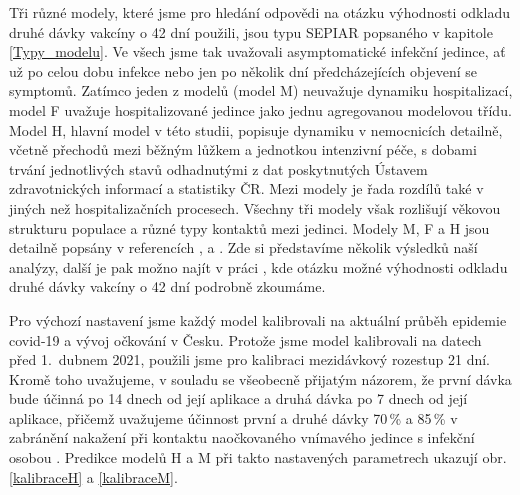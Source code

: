Tři různé modely, které jsme pro hledání odpovědi na otázku výhodnosti odkladu druhé dávky vakcíny o 42 dní použili, jsou typu SEPIAR popsaného v kapitole \ref{Typy_modelu}. Ve všech jsme tak uvažovali asymptomatické infekční jedince, ať už po celou dobu infekce nebo jen po několik dní předcházejících objevení se symptomů. Zatímco jeden z modelů (model M) neuvažuje dynamiku hospitalizací, model F uvažuje hospitalizované jedince jako jednu agregovanou modelovou třídu. Model H, hlavní model v této studii, popisuje dynamiku v nemocnicích detailně, včetně přechodů mezi běžným lůžkem a jednotkou intenzivní péče, s dobami trvání jednotlivých stavů odhadnutými z dat poskytnutých Ústavem zdravotnických informací a statistiky ČR. Mezi modely je řada rozdílů také v jiných než hospitalizačních procesech. Všechny tři modely však rozlišují věkovou strukturu populace a různé typy kontaktů mezi jedinci. Modely M, F a H jsou detailně popsány v referencích \cite{M-techrep2021}, \cite{Smid2021seir} a \cite{vaccpaper}. Zde si představíme několik výsledků naší analýzy, další je pak možno najít v práci \cite{vaccpaper}, kde otázku možné výhodnosti odkladu druhé dávky vakcíny o 42 dní podrobně zkoumáme. 

Pro výchozí nastavení jsme každý model kalibrovali na aktuální průběh epidemie covid-19 a vývoj očkování v Česku. Protože jsme model kalibrovali na datech před 1.\ dubnem 2021, použili jsme pro kalibraci mezidávkový rozestup 21 dní. Kromě toho uvažujeme, v souladu se všeobecně přijatým názorem, že první dávka bude účinná po 14 dnech od její aplikace a druhá dávka po 7 dnech od její aplikace, přičemž uvažujeme účinnost první a druhé dávky 70\,\% a 85\,\% v zabránění nakažení při kontaktu naočkovaného vnímavého jedince s infekční osobou \cite{Hall_etal2021}. Predikce modelů H a M při takto nastavených parametrech ukazují obr.\,\ref{kalibraceH} a \ref{kalibraceM}. 

